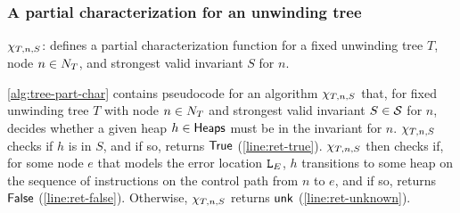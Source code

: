 \subsubsection{A partial characterization for an unwinding tree}
\label{sec:tree-part-char}

\begin{algorithm}[ht]
  {
    \Return{$\true$} \label{line:ret-true}
  }
  {
    \Return{$\false$} \label{line:ret-false}
  }
  \Return{$\unknown$} \label{line:ret-unknown}
  \caption{$\chi_{T, n, S}$: defines a partial
    characterization function for a fixed unwinding tree $T$, node $n
    \in N_T$, and strongest valid invariant $S$ for $n$.}
  \label{alg:tree-part-char}
\end{algorithm}

\autoref{alg:tree-part-char} contains pseudocode for an algorithm
$\chi_{T, n, S}$ that, for fixed unwinding tree $T$ with node
$n \in N_T$ and strongest valid invariant $S \in \mathcal{S}$ for
$n$, decides whether a given heap $h \in \mathsf{Heaps}$ must be in the
invariant for $n$.
%
$\chi_{T, n, S}$ checks if $h$ is in $S$, and if so, returns
$\true$ (\autoref{line:ret-true}).
%
$\chi_{T, n, S}$ then checks if, for some node $e$ that
models the error location $\mathtt{L}_E$, $h$ transitions to some heap on
the sequence of instructions on the control path from $n$ to $e$, and
if so, returns $\false$ (\autoref{line:ret-false}).
%
Otherwise, $\chi_{T, n, S}$ returns $\unknown$
(\autoref{line:ret-unknown}).

